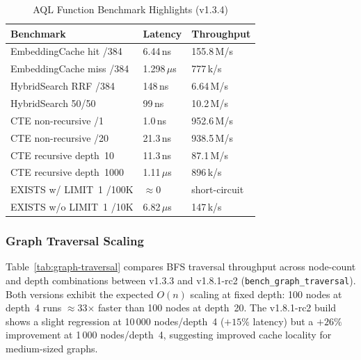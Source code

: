 \documentclass[conference]{IEEEtran}
\begin{document}
\begin{table}[t]
  \caption{AQL Function Benchmark Highlights (v1.3.4)}
  \label{tab:aql-funcs}
  \centering
  \begin{tabular}{L{3.0cm}R{1.3cm}R{1.7cm}}
    \toprule
    \textbf{Benchmark} & \textbf{Latency} & \textbf{Throughput} \\
    \midrule
    EmbeddingCache hit /384       & 6.44\,ns  & 155.8\,M/s \\
    EmbeddingCache miss /384      & 1.298\,$\mu$s & 777\,k/s \\
    HybridSearch RRF /384         & 148\,ns   & 6.64\,M/s \\
    HybridSearch 50/50            & 99\,ns    & 10.2\,M/s \\
    CTE non-recursive /1          & 1.0\,ns   & 952.6\,M/s \\
    CTE non-recursive /20         & 21.3\,ns  & 938.5\,M/s \\
    CTE recursive depth~10        & 11.3\,ns  & 87.1\,M/s \\
    CTE recursive depth~1000      & 1.11\,$\mu$s & 896\,k/s \\
    EXISTS w/ LIMIT~1 /100K       & $\approx$0 & short-circuit \\
    EXISTS w/o LIMIT~1 /10K       & 6.82\,$\mu$s & 147\,k/s \\
    \bottomrule
  \end{tabular}
\end{table}

\subsubsection{Graph Traversal Scaling}
\label{sssec:graph-traversal}

Table~\ref{tab:graph-traversal} compares BFS traversal throughput
across node-count and depth combinations between v1.3.3 and
v1.8.1-rc2 (\texttt{bench\_graph\_traversal}).
Both versions exhibit the expected $O(n)$ scaling at fixed depth:
100 nodes at depth~4 runs $\approx$33$\times$ faster than 100 nodes
at depth~20.
The v1.8.1-rc2 build shows a slight regression at
10\,000 nodes/depth~4 ($+15\%$ latency) but a $+26\%$ improvement
at 1\,000 nodes/depth~4, suggesting improved cache locality for
medium-sized graphs.
\end{document}
